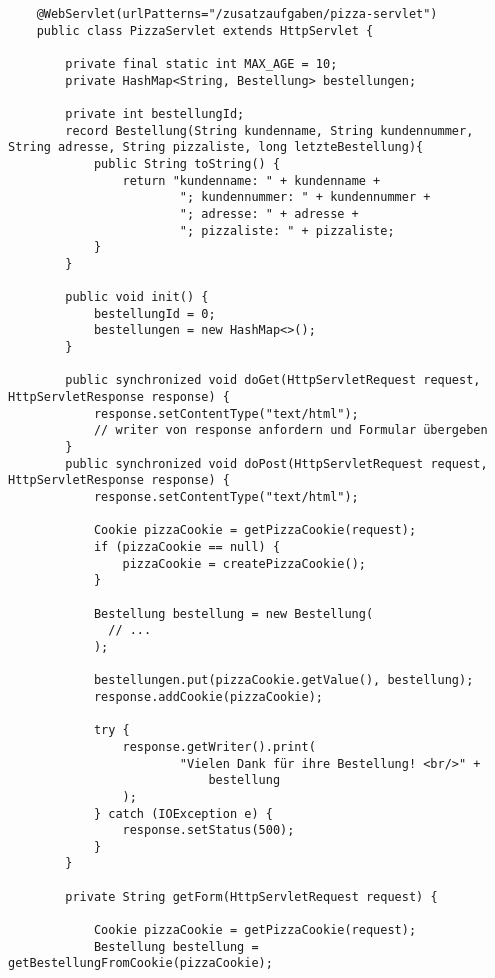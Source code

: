 \begin{verbatim}
    @WebServlet(urlPatterns="/zusatzaufgaben/pizza-servlet")
    public class PizzaServlet extends HttpServlet {

        private final static int MAX_AGE = 10;
        private HashMap<String, Bestellung> bestellungen;

        private int bestellungId;
        record Bestellung(String kundenname, String kundennummer, String adresse, String pizzaliste, long letzteBestellung){
            public String toString() {
                return "kundenname: " + kundenname +
                        "; kundennummer: " + kundennummer +
                        "; adresse: " + adresse +
                        "; pizzaliste: " + pizzaliste;
            }
        }

        public void init() {
            bestellungId = 0;
            bestellungen = new HashMap<>();
        }

        public synchronized void doGet(HttpServletRequest request, HttpServletResponse response) {
            response.setContentType("text/html");
            // writer von response anfordern und Formular übergeben
        }
        public synchronized void doPost(HttpServletRequest request, HttpServletResponse response) {
            response.setContentType("text/html");

            Cookie pizzaCookie = getPizzaCookie(request);
            if (pizzaCookie == null) {
                pizzaCookie = createPizzaCookie();
            }

            Bestellung bestellung = new Bestellung(
              // ...
            );

            bestellungen.put(pizzaCookie.getValue(), bestellung);
            response.addCookie(pizzaCookie);

            try {
                response.getWriter().print(
                        "Vielen Dank für ihre Bestellung! <br/>" +
                            bestellung
                );
            } catch (IOException e) {
                response.setStatus(500);
            }
        }

        private String getForm(HttpServletRequest request) {

            Cookie pizzaCookie = getPizzaCookie(request);
            Bestellung bestellung = getBestellungFromCookie(pizzaCookie);


\end{verbatim}

